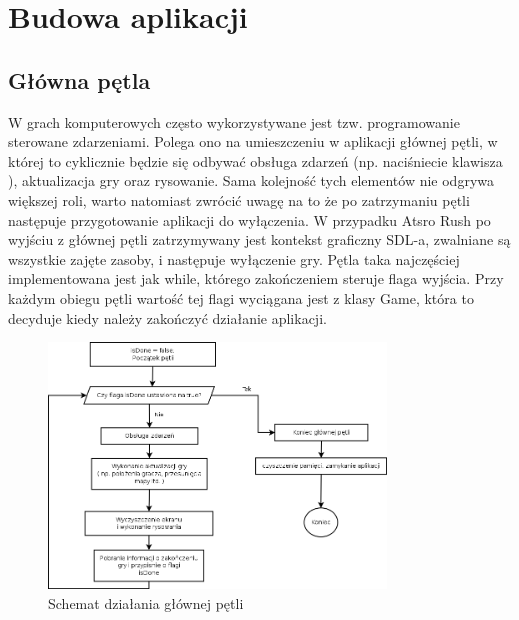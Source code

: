 \chapter{Budowa aplikacji} 

\section{Główna pętla}

W grach komputerowych często wykorzystywane jest tzw. programowanie sterowane zdarzeniami. Polega ono na umieszczeniu w aplikacji głównej pętli, w której to cyklicznie będzie się odbywać obsługa zdarzeń (np. naciśniecie klawisza ), aktualizacja gry oraz rysowanie. Sama kolejność tych elementów nie odgrywa większej roli, warto natomiast zwrócić uwagę na to że po zatrzymaniu pętli następuje przygotowanie aplikacji do wyłączenia. W przypadku Atsro Rush po wyjściu z głównej pętli zatrzymywany jest kontekst graficzny SDL-a, zwalniane są wszystkie zajęte zasoby, i następuje wyłączenie gry. Pętla taka najczęściej implementowana jest jak while, którego zakończeniem steruje flaga wyjścia. Przy każdym obiegu pętli wartość tej flagi wyciągana jest z klasy Game, która to decyduje kiedy należy zakończyć działanie aplikacji. 

\begin{figure}[h]
    \centering
    \includegraphics[width=0.8\textwidth,natwidth=410,natheight=142]{./Pictures/main_loop.png}
    \caption{Schemat działania głównej pętli}
\end{figure}

